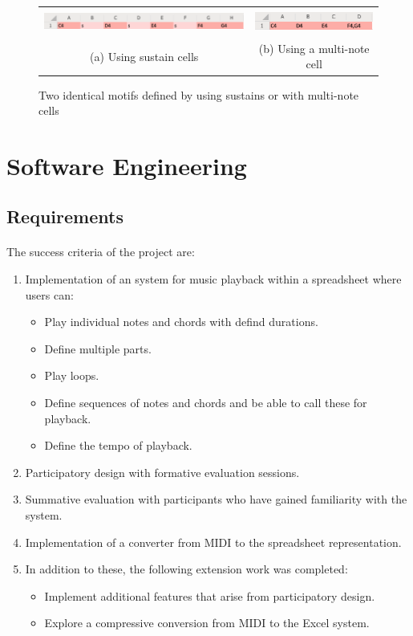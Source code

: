 \begin{figure}[ht]
\begin{tabular}{cc}
  \includegraphics[height=8mm]{figs/withoutMulti.png} &
  \includegraphics[height=8mm]{figs/withMulti.png} \\
  (a) Using sustain cells&(b) Using a multi-note cell\\
\end{tabular}
\caption{Two identical motifs defined by using sustains or with multi-note cells}
\label{prep:sustainMulti}
\end{figure}

\section{Software Engineering}

\subsection{Requirements}

\paragraph{} The success criteria of the project are:

\begin{enumerate}
  \item Implementation of an system for music playback within a spreadsheet where users can:
  \begin{itemize}
     \item Play individual notes and chords with defind durations.
     \item Define multiple parts.
     \item Play loops.
     \item Define sequences of notes and chords and be able to call these for playback.
     \item Define the tempo of playback.
   \end{itemize}
  \item Participatory design with formative evaluation sessions.
  \item Summative evaluation with participants who have gained familiarity with the system.
  \item Implementation of a converter from MIDI to the spreadsheet representation.
  \item In addition to these, the following extension work was completed:
  \begin{itemize}
     \item Implement additional features that arise from participatory design.
     \item Explore a compressive conversion from MIDI to the Excel system.
   \end{itemize}
\end{enumerate}

